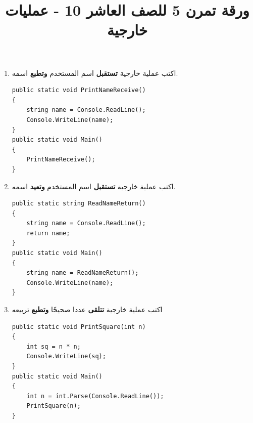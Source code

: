 ﻿\documentclass[12pt]{article}
\title{ورقة تمرن 5 للصف العاشر 10 - عمليات خارجية}
\begin{document}
\maketitle
\thispagestyle{fancy}

\ifwithsols
\begin{enumerate}[itemsep=3em]
\else
\begin{enumerate}
\fi



\begin{boxAttention}
عندما يٌطلب "عملية خارجية \textbf{تستقبل}" يجب ان يكون المستخدم يدخل قيمة للمتغير. أي عليك استعمال \texttt{Console.ReadLine()}. \\


أما عندما يُطلب منك "عملية خارجية \textbf{تتلقى}" فهذا يعني أنّها تتلقى المطلوب كبارمترات.
\end{boxAttention}

\item اكتب عملية خارجية \textbf{تستقبل} اسم المستخدم \textbf{وتطبع} اسمه.
\ifwithsols
\begin{boxSolution}
\begin{english}
\begin{verbatim}
public static void PrintNameReceive()
{
    string name = Console.ReadLine();
    Console.WriteLine(name);
}
public static void Main()
{
    PrintNameReceive();
}
\end{verbatim}
\end{english}
\end{boxSolution}
\fi


\item اكتب عملية خارجية \textbf{تستقبل} اسم المستخدم \textbf{وتعيد} اسمه.
\ifwithsols
\begin{boxSolution}
\begin{english}
\begin{verbatim}
public static string ReadNameReturn()
{
    string name = Console.ReadLine();
    return name;
}
public static void Main()
{
    string name = ReadNameReturn();
    Console.WriteLine(name);
}
\end{verbatim}
\end{english}
\end{boxSolution}
\fi


\item اكتب عملية خارجية \textbf{تتلقى} عددا صحيحًا \textbf{وتطبع} تربيعه
\ifwithsols
\begin{boxSolution}
\begin{english}
\begin{verbatim}
public static void PrintSquare(int n)
{
    int sq = n * n;
    Console.WriteLine(sq);
}
public static void Main()
{
    int n = int.Parse(Console.ReadLine());
    PrintSquare(n);
}
\end{verbatim}
\end{english}
\end{boxSolution}
\fi



\end{enumerate}
\end{enumerate}
\end{document}

